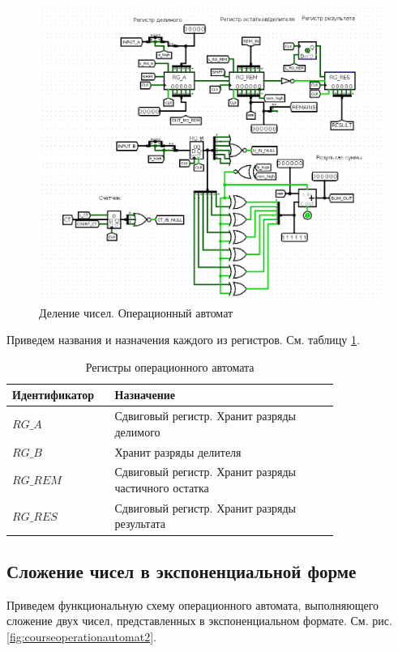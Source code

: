 \documentclass[a4paper,14pt]{extarticle}
\begin{document}
\begin{figure}[htp]
	\centering
	\includegraphics[width=0.8\linewidth]{images/course_operation_automat}
	\caption{Деление чисел. Операционный автомат}
	\label{fig:courseoperationautomat}
\end{figure}


Приведем названия и назначения каждого из регистров. См. таблицу \ref{tab:course_op1_regs}.
\begin{table}[h!]
	\centering
	\small
	\begin{tabular}{|m{0.2\linewidth}|m{0.6\linewidth}|}
		\hline
		\textbf{Идентификатор} & \textbf{Назначение} \\ \hline
		$RG\_A$ & Сдвиговый регистр. Хранит разряды делимого \\ \hline
		$RG\_B$ & Хранит разряды делителя \\ \hline
		$RG\_REM$ & Сдвиговый регистр. Хранит разряды частичного остатка \\ \hline
		$RG\_RES$ & Сдвиговый регистр. Хранит разряды результата \\ \hline
	\end{tabular}
	\caption{Регистры операционного автомата}
	\label{tab:course_op1_regs}
\end{table}
\newpage
\subsection{Сложение чисел в экспоненциальной форме}

Приведем функциональную схему операционного автомата, выполняющего сложение двух чисел, представленных в экспоненциальном формате. См. рис. \ref{fig:courseoperationautomat2}.
\end{document}
